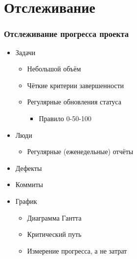 \documentclass{../../slides-style}
\begin{document}
    \begin{frame}[plain]
        \titlepage
    \end{frame}

    \section{Отслеживание}

    \begin{frame}
        \frametitle{Отслеживание прогресса проекта}
        \begin{itemize}
            \item Задачи
            \begin{itemize}
                \item Небольшой объём
                \item Чёткие критерии завершенности
                \item Регулярные обновления статуса
                \begin{itemize}
                    \item Правило 0-50-100
                \end{itemize}
            \end{itemize}
            \item Люди
            \begin{itemize}
                \item Регулярные (еженедельные) отчёты 
            \end{itemize}
            \item Дефекты
            \item Коммиты
            \item График
            \begin{itemize}
                \item Диаграмма Гантта
                \item Критический путь
                \item Измерение прогресса, а не затрат
            \end{itemize}
        \end{itemize}
    \end{frame}
\end{document}
